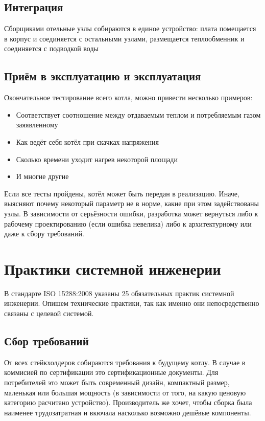 \documentclass[bibliography=totocnumbered]{scrartcl}
\begin{document}
\subsection{Интеграция}
Сборщиками отельные узлы собираются в единое устройство: плата помещается в корпус и соединяется с остальными узлами, размещается теплообменник и соединяется с подводкой воды

\subsection{Приём в эксплуатацию и эксплуатация}
Окончательное тестирование всего котла, можно привести несколько примеров:

\begin{itemize}
    \item Соответствует соотношение между отдаваемым теплом и потребляемым газом заяявленному
    \item Как ведёт себя котёл при скачках напряжения
    \item Сколько времени уходит нагрев некоторой площади
    \item И многие другие
\end{itemize}
Если все тесты пройдены, котёл может быть передан в реализацию. Иначе, выясняют почему некоторый параметр не в норме, какие при этом задействованы узлы. В зависимости от серьёзности ошибки, разработка может вернуться либо к рабочему проектированию (если ошибка невелика) либо к архитектурному или даже к сбору требований.

\section{Практики системной инженерии}
В стандарте ISO 15288:2008 указаны 25 обязательных практик системной инженерии. Опишем технические практики, так как именно они непосредственно связаны с целевой системой.

\subsection{Сбор требований}
От всех стейкхолдеров собираются требования к будущему котлу. В случае в коммисией по сертификации это сертификационные документы. Для потребителей это может быть современный дизайн, компактный размер, маленькая или большая мощность (в зависимости от того, на какую ценовую категорию расчитано устройство). Производитель же хочет, чтобы сборка была наименее трудозатратная и вкючала насколько возможно дешёвые компоненты.
\end{document}
